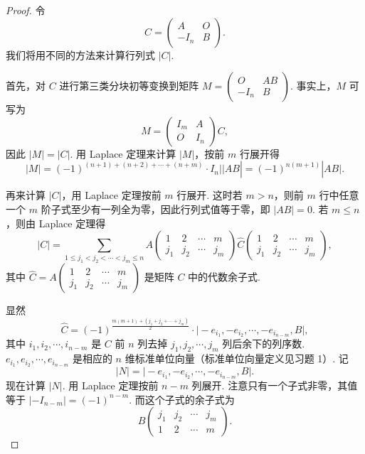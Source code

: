 \begin{proof}
    令
    \[
    C =
    \begin{pmatrix}
    A & O \\
    -I_n & B
    \end{pmatrix}.
    \]
    我们将用不同的方法来计算行列式 $|C|$.

    首先，对 $C$ 进行第三类分块初等变换到矩阵 $M = \begin{pmatrix} O & AB \\ -I_n & B \end{pmatrix}$. 事实上，$M$ 可写为
    \[
    M =
    \begin{pmatrix}
    I_m & A \\
    O & I_n
    \end{pmatrix}
    C,
    \]
    因此 $|M| = |C|$. 用 Laplace 定理来计算 $|M|$，按前 $m$ 行展开得
    \[
    |M| = (-1)^{(n+1)+(n+2)+\cdots+(n+m)} \cdot I_n ||AB| = (-1)^{n(m+1)} |AB|.
    \]

    再来计算 $|C|$，用 Laplace 定理按前 $m$ 行展开. 这时若 $m > n$，则前 $m$ 行中任意一个 $m$ 阶子式至少有一列全为零，因此行列式值等于零，即 $|AB| = 0$. 若 $m \leqslant n$，则由 Laplace 定理得
    \[
    |C| = \sum_{1 \leqslant j_1 < j_2 < \cdots < j_m \leqslant n} A
    \begin{pmatrix}
    1 & 2 & \cdots & m \\
    j_1 & j_2 & \cdots & j_m
    \end{pmatrix}
    \hat{C}
    \begin{pmatrix}
    1 & 2 & \cdots & m \\
    j_1 & j_2 & \cdots & j_m
    \end{pmatrix},
    \]
    其中 $\hat{C} = A \begin{pmatrix} 1 & 2 & \cdots & m \\ j_1 & j_2 & \cdots & j_m \end{pmatrix}$ 是矩阵 $C$ 中的代数余子式.

    显然
    \[
    \hat{C} = (-1)^{\frac{m(m+1) + (j_1 + j_2 + \cdots + j_m)}{2}} \cdot \mid - e_{i_1}, - e_{i_2}, \cdots, - e_{i_{n-m}}, B |,
    \]
    其中 $i_1, i_2, \cdots, i_{n-m}$ 是 $C$ 前 $n$ 列去掉 $j_1, j_2, \cdots, j_m$ 列后余下的列序数. $e_{i_1}, e_{i_2}, \cdots, e_{i_{n-m}}$ 是相应的 $n$ 维标准单位向量（标准单位向量定义见习题 1）. 记
    \[
    |N| = \mid - e_{i_1}, - e_{i_2}, \cdots, - e_{i_{n-m}}, B |.
    \]
    现在计算 $|N|$. 用 Laplace 定理按前 $n-m$ 列展开. 注意只有一个子式非零，其值等于 $| - I_{n-m}| = (-1)^{n-m}$. 而这个子式的余子式为
    \[
    B \begin{pmatrix} j_1 & j_2 & \cdots & j_m \\ 1 & 2 & \cdots & m \end{pmatrix}.
    \]


\end{proof}
